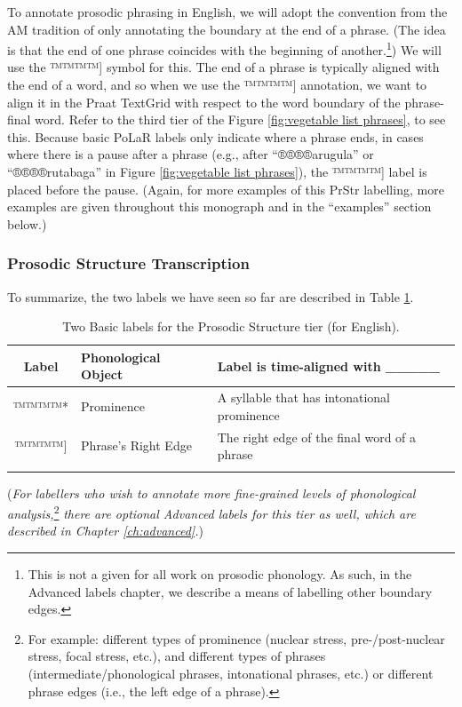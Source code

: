\documentclass[11pt, twoside]{memoir}
\begin{document}
To annotate prosodic phrasing in English, we will adopt the convention from the AM tradition of only annotating the boundary at the end of a phrase. (The idea is that the end of one phrase coincides with the beginning of another.\footnote{This is not a given for all work on prosodic phonology. As such, in the Advanced labels chapter, we describe a means of labelling other boundary edges.}) We will use the ™™™™{]} symbol for this. The end of a phrase is typically aligned with the end of a word, and so when we use the ™™™™{]} annotation, we want to align it in the Praat TextGrid with respect to the word boundary of the phrase-final word. Refer to the third tier of the Figure \ref{fig:vegetable list phrases}, to see this. Because basic PoLaR labels only indicate where a phrase ends, in cases where there is a pause after a phrase (e.g., after “®®®®{arugula}” or “®®®®{rutabaga}” in Figure \ref{fig:vegetable list phrases}), the ™™™™{]} label is placed before the pause. (Again, for more examples of this PrStr labelling, more examples are given throughout this monograph and in the “examples” section below.)

\subsubsection{Prosodic Structure Transcription}
To summarize, the two labels we have seen so far are described in Table \ref{2 PrStr basic labels}.

\begin{longtable}{cll} \toprule \textbf{Label} & \textbf{Phonological Object} & \textbf{Label is time-aligned with \_\_\_\_\_}\tabularnewline
\midrule \endhead
™™™™{*} & Prominence & A syllable that has intonational prominence \tabularnewline
™™™™{]} & Phrase’s Right Edge & The right edge of the final word of a phrase \tabularnewline
\bottomrule 
\caption{Two Basic labels for the Prosodic Structure tier (for English).%
\label{2 PrStr basic labels}%
}
\end{longtable}

(\textit{For labellers who wish to annotate more fine-grained levels of phonological analysis,}\footnote{For example: different types of prominence (nuclear stress, pre-\slash post-nuclear stress, focal stress, etc.), and different types of phrases (intermediate\slash phonological phrases, intonational phrases, etc.) or different phrase edges (i.e., the left edge of a phrase).} \textit{there are optional Advanced labels for this tier as well, which are described in Chapter \ref{ch:advanced}.})
\end{document}
